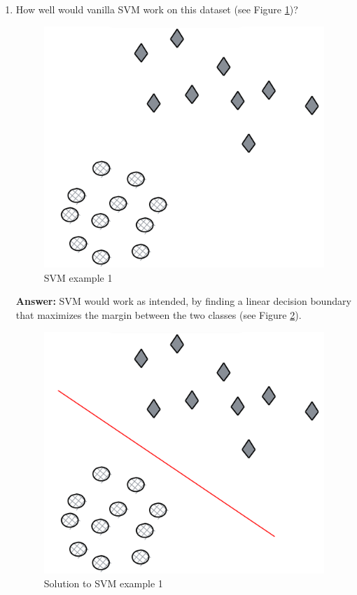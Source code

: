 \documentclass{article}
\newenvironment{QandA}{\begin{enumerate}[label=\arabic*.]}{\end{enumerate}}
\newenvironment{InnerQandA}{\begin{enumerate}[label=\roman*.]}{\end{enumerate}}
\newenvironment{answer}{\par\normalfont \textbf{Answer:}}{}
\begin{document}
\begin{QandA}
\begin{InnerQandA}
        \item How well would vanilla SVM work on this dataset (see Figure \ref{fig:svm-example-1})?
        \begin{figure}[htb!]
            \centering
            \includegraphics[width=0.3\columnwidth]{img/svm-example-1.png}
            \caption{SVM example 1}
            \label{fig:svm-example-1}
        \end{figure}
        \begin{answer}
            SVM would work as intended, by finding a linear decision boundary that maximizes the margin between the two classes (see Figure \ref{fig:-sol-svm-example-1}).
            \begin{figure}[htb!]
                \centering
                \includegraphics[width=0.3\columnwidth]{img/sol-svm-example-1.png}
                \caption{Solution to SVM example 1}
                \label{fig:-sol-svm-example-1}
            \end{figure}
        \end{answer}


\end{InnerQandA}
\end{QandA}
\end{document}
